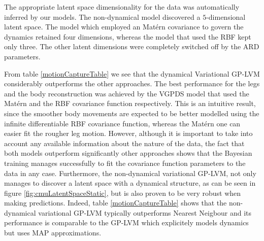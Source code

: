 \documentclass [10pt , a4paper]{article}
\begin{document}
%
The appropriate latent space dimensionality for the data was
automatically inferred by our models. 
The non-dynamical model
discovered a $5$-dimensional latent space.
The model which employed an Mat\'ern covariance to govern the dynamics retained four dimensions,
whereas the model that used the RBF kept only three. 
%
%
The other latent dimensions were completely switched off by the ARD
parameters.



 From table
\ref{motionCaptureTable} we see that the dynamical Variational GP-LVM
considerably outperforms the other approaches.
The best performance for the legs and the body
reconstruction was achieved by the VGPDS model that used the Mat\'ern
and the RBF covariance function respectively. This is an intuitive result, since the smoother
body movements are expected to be better modelled using the infinite differentiable
RBF covariance function, whereas the Mat\'ern one can easier fit the rougher leg motion.
However, although it is important to take into account any available information about the nature of
the data, the fact that both models outperform significantly other approaches shows that the Bayesian
training manages successfully to fit the covariance function parameters to the data in any case.
%
%
Furthermore, the non-dynamical variational GP-LVM, not only manages to discover a latent space with a dynamical
structure, as can be seen in figure \ref{fig:cmuLatentSpaceStatic}, but is also proven to be very robust when making predictions. Indeed,
table \ref{motionCaptureTable} shows that the non-dynamical variational GP-LVM typically outperforms Nearest Neigbour
and its performance is comparable to the GP-LVM which explicitely models dynamics but uses MAP approximations.
\end{document}
